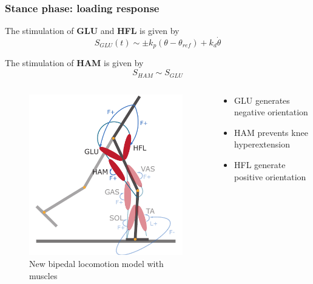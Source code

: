 \documentclass[10pt]{beamer}
\begin{document}
\begin{frame}
	\frametitle{Stance phase: loading response}
	
	\begin{block}{}
		The stimulation of \textbf{GLU} and \textbf{HFL}  is given by
		\begin{equation*}
			S_{GLU}(t) \sim \pm k_p (\theta-\theta_{ref}) + k_d \dot{\theta}
		\end{equation*}
	\end{block}
	\begin{block}{}
		The stimulation of \textbf{HAM} is given by	
		\begin{equation*}
			S_{HAM} \sim S_{GLU}
		\end{equation*}
	\end{block}		
	
	
	\begin{columns}
		\begin{column}{.5\textwidth}
			\begin{figure}
				\centering
				\includegraphics[height=.45\textheight]{images/new_model/stance/muscle_vas_sol_gas_ta_ham_glu_hfl_floor.pdf}
				\caption{New bipedal locomotion model with muscles}	
			\end{figure}
		\end{column}
		\begin{column}{.5\textwidth}
			\begin{itemize}
				\item GLU generates negative orientation
				\item HAM prevents knee hyperextension
				\item HFL generate positive orientation				
			\end{itemize}
		\end{column}
	\end{columns}
\end{frame}
\end{document}
